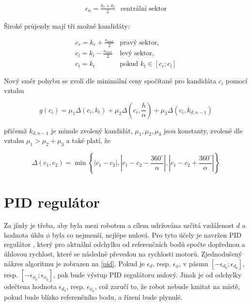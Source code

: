 \documentclass[twoside]{ctuthesis}
\theoremstyle{plain}
\theoremstyle{definition}
\theoremstyle{note}
\begin{document}
$$\begin{array}{ll}
c_n = \frac{k_r + k_l}{2}&\textrm{centrální sektor}
\end{array}$$

Široké průjezdy mají tři možné kandidáty:

$$\begin{array}{ll}
c_r = k_r + \frac{s_{max}}{2}&\textrm{pravý sektor,}\\

c_l = k_l - \frac{s_{max}}{2}&\textrm{levý sektor,}\\

c_t = k_t&\textrm{pokud $k_t \in \left[c_r;c_l\right]$}
\end{array}$$

Nový směr pohybu se zvolí dle minimální ceny spočítané pro kandidáta $c_i$ pomocí vztahu \cite{cite:13}

\begin{equation}
g(c_i) = \mu_1 \Delta\left(c_i, k_t\right) + \mu_2\Delta\left(c_i, \frac{h}{\alpha}\right) + \mu_3\Delta\left(c_i, k_{d, n-1}\right)
\end{equation}

přičemž $k_{d, n-1}$ je minule zvolený kandidát,
$\mu_1, \mu_2, \mu_3$ jsou konstanty, zvolené dle vztahu $\mu_1 > \mu_2 + \mu_3$ a také platí, že

\begin{equation}
\Delta(c_1, c_2) = \min\left\{|c_1 - c_2|, |c_1 - c_2 - \frac{360^{\circ}}{\alpha}|, |c_1 - c_2 + \frac{360^{\circ}}{\alpha}|\right\}
\end{equation}


\section{PID regulátor}


Za jízdy je třeba, aby byla mezi robotem a cílem udržována určitá vzdálenost $d$ a hodnota úhlu $\phi$ byla co nejmenší, nejlépe nulová. Pro tyto účely je navržen PID regulátor  \cite{cite:14}, který pro aktuální odchylku od referenčních bodů spočte dopřednou a úhlovou rychlost, které se následně převedou na rychlosti motorů. Zjednodušený nákres algoritmu je zobrazen na \ref{pid}.  Pokud je $\epsilon_d$, resp. $\epsilon_\phi$, v pásmu $\left[-\epsilon_{d_0}; \epsilon_{d_0}\right]$, resp. $\left[-\epsilon_{\phi_0}; \epsilon_{\phi_0}\right]$, pak bude výstup PID regulátoru nulový. Jinak je od odchylky odečtena hodnota $\epsilon_{d_0}$, resp. $\epsilon_{\phi_0}$, což zaručí to, že robot nebude kmitat na místě, pokud bude blízko referenčního bodu, a řízení bude plynulé.
\end{document}
